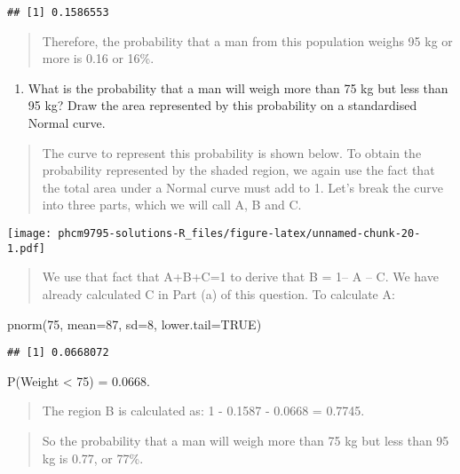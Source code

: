 \documentclass[
]{memoir}
\newenvironment{Shaded}{\begin{snugshade}}{\end{snugshade}}
\newcommand{\AttributeTok}[1]{\textcolor[rgb]{0.77,0.63,0.00}{#1}}
\newcommand{\ConstantTok}[1]{\textcolor[rgb]{0.00,0.00,0.00}{#1}}
\newcommand{\DecValTok}[1]{\textcolor[rgb]{0.00,0.00,0.81}{#1}}
\newcommand{\FunctionTok}[1]{\textcolor[rgb]{0.00,0.00,0.00}{#1}}
\newcommand{\NormalTok}[1]{#1}
\providecommand{\tightlist}{%
  \setlength{\itemsep}{0pt}\setlength{\parskip}{0pt}}
\begin{document}
\begin{verbatim}
## [1] 0.1586553
\end{verbatim}

\begin{quote}
Therefore, the probability that a man from this population weighs 95 kg or more is 0.16 or 16\%.
\end{quote}

\begin{enumerate}
\def\labelenumi{\alph{enumi})}
\setcounter{enumi}{1}
\tightlist
\item
  What is the probability that a man will weigh more than 75 kg but less than 95 kg? Draw the area represented by this probability on a standardised Normal curve.
\end{enumerate}

\begin{quote}
The curve to represent this probability is shown below. To obtain the probability represented by the shaded region, we again use the fact that the total area under a Normal curve must add to 1. Let's break the curve into three parts, which we will call A, B and C.
\end{quote}

\texttt{[image: phcm9795-solutions-R\_files/figure-latex/unnamed-chunk-20-1.pdf]}

\begin{quote}
We use that fact that A+B+C=1 to derive that B = 1-- A -- C. We have already calculated C in Part (a) of this question. To calculate A:
\end{quote}

\begin{Shaded}
\begin{Highlighting}[]
\FunctionTok{pnorm}\NormalTok{(}\DecValTok{75}\NormalTok{, }\AttributeTok{mean=}\DecValTok{87}\NormalTok{, }\AttributeTok{sd=}\DecValTok{8}\NormalTok{, }\AttributeTok{lower.tail=}\ConstantTok{TRUE}\NormalTok{)}
\end{Highlighting}
\end{Shaded}

\begin{verbatim}
## [1] 0.0668072
\end{verbatim}

P(Weight \textless{} 75) = 0.0668.

\begin{quote}
The region B is calculated as: 1 - 0.1587 - 0.0668 = 0.7745.
\end{quote}

\begin{quote}
So the probability that a man will weigh more than 75 kg but less than 95 kg is 0.77, or 77\%.
\end{quote}
\end{document}
